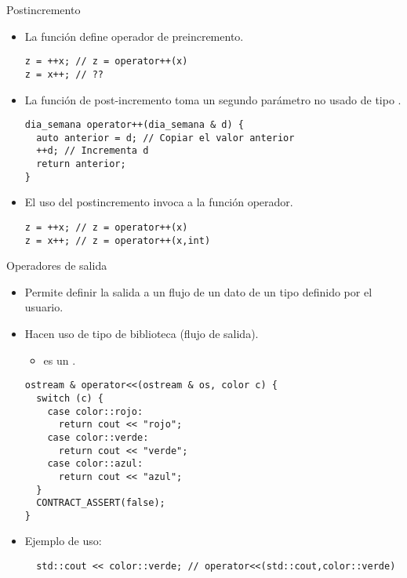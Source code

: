 \begin{frame}[t,fragile]{Postincremento}
\begin{itemize}
  \item La función \cppid{++} define operador de 
        preincremento.
\begin{lstlisting}
z = ++x; // z = operator++(x)
z = x++; // ??
\end{lstlisting}
  
  \item La función de post-incremento toma un segundo parámetro
        no usado de tipo .
\begin{lstlisting}
dia_semana operator++(dia_semana & d) {
  auto anterior = d; // Copiar el valor anterior
  ++d; // Incrementa d
  return anterior;
}
\end{lstlisting}

  \item El uso del postincremento invoca a la función operador.
\begin{lstlisting}
z = ++x; // z = operator++(x)
z = x++; // z = operator++(x,int)
\end{lstlisting}
\end{itemize}
\end{frame}

\begin{frame}[fragile]{Operadores de salida}
\begin{itemize}
  \item Permite definir la salida a un flujo de un dato de un tipo definido por el usuario.
  \item Hacen uso de tipo de biblioteca  (flujo de salida).
    \begin{itemize}
      \item {} es un .
    \end{itemize}
\begin{lstlisting}
ostream & operator<<(ostream & os, color c) {
  switch (c) {
    case color::rojo:
      return cout << "rojo";
    case color::verde:
      return cout << "verde";
    case color::azul:
      return cout << "azul";
  }
  CONTRACT_ASSERT(false);
}
\end{lstlisting}
  \item Ejemplo de uso:
\begin{lstlisting}
  std::cout << color::verde; // operator<<(std::cout,color::verde)
\end{lstlisting}
\end{itemize}
\end{frame}

